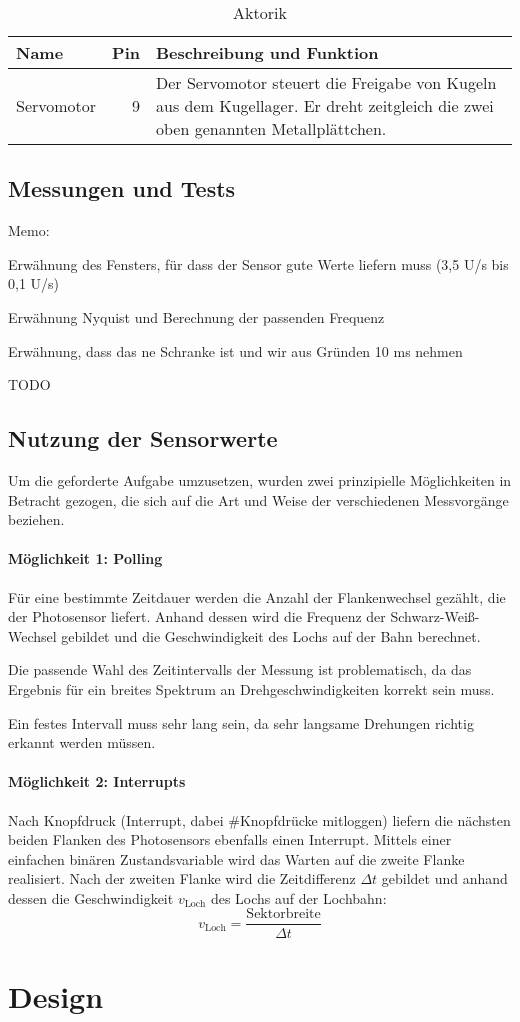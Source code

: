\documentclass[11pt,a4paper]{scrartcl}
\newcommand{\tablewidth}{.9\textwidth}
\begin{document}
\begin{table}[htbp]
	\centering
	\begin{tabularx}{\tablewidth}{|l|r|X|}
		\hline
		\bfseries Name & \bfseries Pin & \bfseries Beschreibung und Funktion\\\hline\hline
		Servomotor & 9 & Der Servomotor steuert die Freigabe von Kugeln aus dem Kugellager. Er dreht zeitgleich die zwei oben genannten Metallplättchen.\\\hline
	\end{tabularx}
	\caption{Aktorik}
\end{table}
\subsection{Messungen und Tests}
Memo:
\begin{compactitem}
\item Erwähnung des Fensters, für dass der Sensor gute Werte liefern muss (3,5 U/s bis 0,1 U/s)
\item Erwähnung Nyquist und Berechnung der passenden Frequenz
\item Erwähnung, dass das ne Schranke ist und wir aus Gründen 10 ms nehmen
\end{compactitem}
TODO %
\subsection{Nutzung der Sensorwerte} \label{ssec:nutzung}
Um die geforderte Aufgabe umzusetzen, wurden zwei prinzipielle Möglichkeiten in Betracht gezogen, die sich auf die Art und Weise der verschiedenen Messvorgänge beziehen.
\paragraph{Möglichkeit 1: Polling} Für eine bestimmte Zeitdauer werden die Anzahl der Flankenwechsel gezählt, die der Photosensor liefert. Anhand dessen wird die Frequenz der Schwarz-Weiß-Wechsel gebildet und die Geschwindigkeit des Lochs auf der Bahn berechnet.
\begin{compactitem}
\item Die passende Wahl des Zeitintervalls der Messung ist problematisch, da das Ergebnis für ein breites Spektrum an Drehgeschwindigkeiten korrekt sein muss.
\item Ein festes Intervall muss sehr lang sein, da sehr langsame Drehungen richtig erkannt werden müssen.
\end{compactitem}
\paragraph{Möglichkeit 2: Interrupts} Nach Knopfdruck (Interrupt, dabei \#Knopfdrücke mitloggen) liefern die nächsten beiden Flanken des Photosensors ebenfalls einen Interrupt. Mittels einer einfachen binären Zustandsvariable wird das Warten auf die zweite Flanke realisiert. Nach der zweiten Flanke wird die Zeitdifferenz $\Delta t$ gebildet und anhand dessen die Geschwindigkeit $v_\text{Loch}$ des Lochs auf der Lochbahn: \[v_{\text{Loch}} = \frac{\text{Sektorbreite}}{\Delta t}\]

\section{Design}
	
\end{document}
